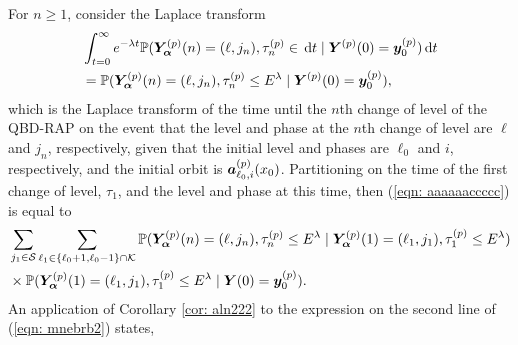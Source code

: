 For \(n\geq 1\), consider the Laplace transform 
\begin{align}
	&\int_{t=0}^\infty e^{-\lambda t} \mathbb P(\bm{Y}_{\bm{\alpha}}^{(p)}(n) = (\ell, j_n), \tau_{n}^{(p)}\in \, \mathrm{d} t
	 \mid \boldsymbol Y^{(p)}(0)=\boldsymbol y_0^{(p)}) \, \mathrm{d} t \nonumber 
	 \\&=\mathbb P(\bm{Y}_{\bm{\alpha}}^{(p)}(n) = (\ell, j_n), \tau_{n}^{(p)}\leq E^{\lambda}
	 \mid \boldsymbol Y^{(p)}(0)=\boldsymbol y_0^{(p)}),\label{eqn: aaaaaaccccc} 
\end{align}
which is the Laplace transform of the time until the \(n\)th change of level of the QBD-RAP on the event that the level and phase at the \(n\)th change of level are \(\ell\) and \(j_n\), respectively, given that the initial level and phases are \(\ell_0\) and \(i\), respectively, and the initial orbit is \(\boldsymbol a_{\ell_0,i}^{(p)}(x_0)\). Partitioning on the time of the first change of level, \(\tau_1\), and the level and phase at this time, then (\ref{eqn: aaaaaaccccc}) is equal to 
\begin{align}
	&\sum_{j_1\in\mathcal S}\sum_{\ell_1\in\{\ell_0+1,\ell_0-1\}\cap \mathcal K}\mathbb P(\bm{Y}_{\bm{\alpha}}^{(p)}(n) = (\ell, j_n), \tau_{n}^{(p)}\leq E^\lambda 
	 \mid \bm{Y}_{\bm{\alpha}}^{(p)}(1)=(\ell_1, j_1), \tau_1^{(p)}\leq E^\lambda ) \nonumber
	 \\&\times \mathbb P(\bm{Y}_{\bm{\alpha}}^{(p)}(1)=(\ell_1, j_1), \tau_{1}^{(p)}\leq E^\lambda
	 \mid \boldsymbol Y(0)=\boldsymbol y_0^{(p)}).
	 \label{eqn: mnebrb2}
\end{align}
An application of Corollary \ref{cor: aln222} to the expression on the second line of (\ref{eqn: mnebrb2}) states, 
